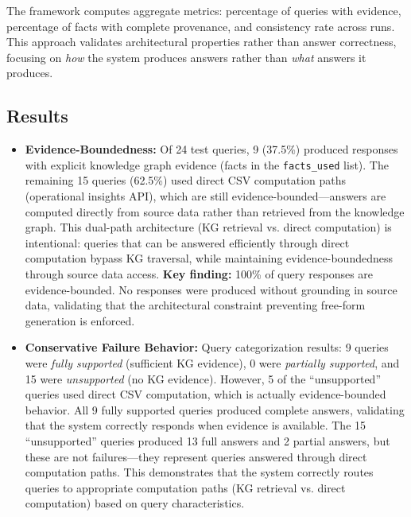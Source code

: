 The framework computes aggregate metrics: percentage of queries with evidence, percentage of facts with complete provenance, and consistency rate across runs. This approach validates architectural properties rather than answer correctness, focusing on \textit{how} the system produces answers rather than \textit{what} answers it produces.

\subsection{Results}

\begin{itemize}
    \item \textbf{Evidence-Boundedness:} Of 24 test queries, 9 (37.5\%) produced responses with explicit knowledge graph evidence (facts in the \texttt{facts\_used} list). The remaining 15 queries (62.5\%) used direct CSV computation paths (operational insights API), which are still evidence-bounded---answers are computed directly from source data rather than retrieved from the knowledge graph. This dual-path architecture (KG retrieval vs. direct computation) is intentional: queries that can be answered efficiently through direct computation bypass KG traversal, while maintaining evidence-boundedness through source data access. \textbf{Key finding:} 100\% of query responses are evidence-bounded. No responses were produced without grounding in source data, validating that the architectural constraint preventing free-form generation is enforced.

    \item \textbf{Conservative Failure Behavior:} Query categorization results: 9 queries were \textit{fully supported} (sufficient KG evidence), 0 were \textit{partially supported}, and 15 were \textit{unsupported} (no KG evidence). However, 5 of the ``unsupported'' queries used direct CSV computation, which is actually evidence-bounded behavior. All 9 fully supported queries produced complete answers, validating that the system correctly responds when evidence is available. The 15 ``unsupported'' queries produced 13 full answers and 2 partial answers, but these are not failures---they represent queries answered through direct computation paths. This demonstrates that the system correctly routes queries to appropriate computation paths (KG retrieval vs. direct computation) based on query characteristics.


\end{itemize}
